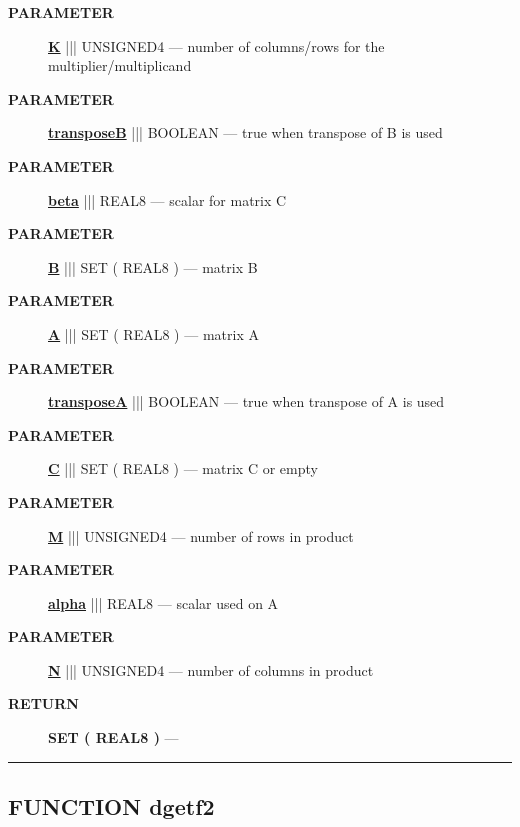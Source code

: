 \par
\begin{description}
\item [\colorbox{tagtype}{\color{white} \textbf{\textsf{PARAMETER}}}] \textbf{\underline{K}} ||| UNSIGNED4 --- number of columns/rows for the multiplier/multiplicand
\item [\colorbox{tagtype}{\color{white} \textbf{\textsf{PARAMETER}}}] \textbf{\underline{transposeB}} ||| BOOLEAN --- true when transpose of B is used
\item [\colorbox{tagtype}{\color{white} \textbf{\textsf{PARAMETER}}}] \textbf{\underline{beta}} ||| REAL8 --- scalar for matrix C
\item [\colorbox{tagtype}{\color{white} \textbf{\textsf{PARAMETER}}}] \textbf{\underline{B}} ||| SET ( REAL8 ) --- matrix B
\item [\colorbox{tagtype}{\color{white} \textbf{\textsf{PARAMETER}}}] \textbf{\underline{A}} ||| SET ( REAL8 ) --- matrix A
\item [\colorbox{tagtype}{\color{white} \textbf{\textsf{PARAMETER}}}] \textbf{\underline{transposeA}} ||| BOOLEAN --- true when transpose of A is used
\item [\colorbox{tagtype}{\color{white} \textbf{\textsf{PARAMETER}}}] \textbf{\underline{C}} ||| SET ( REAL8 ) --- matrix C or empty
\item [\colorbox{tagtype}{\color{white} \textbf{\textsf{PARAMETER}}}] \textbf{\underline{M}} ||| UNSIGNED4 --- number of rows in product
\item [\colorbox{tagtype}{\color{white} \textbf{\textsf{PARAMETER}}}] \textbf{\underline{alpha}} ||| REAL8 --- scalar used on A
\item [\colorbox{tagtype}{\color{white} \textbf{\textsf{PARAMETER}}}] \textbf{\underline{N}} ||| UNSIGNED4 --- number of columns in product
\end{description}







\par
\begin{description}
\item [\colorbox{tagtype}{\color{white} \textbf{\textsf{RETURN}}}] \textbf{SET ( REAL8 )} --- 
\end{description}




\rule{\linewidth}{0.5pt}
\subsection*{\textsf{\colorbox{headtoc}{\color{white} FUNCTION}
dgetf2}}


